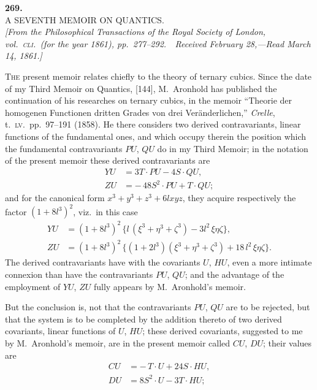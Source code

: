 \documentclass[11pt]{article}
\begin{document}
\newpage
\setcounter{page}{325}


\begin{center}
\textbf{269.}\\[1em]
{\Large A SEVENTH MEMOIR ON QUANTICS.}\\[1em]
\textit{[From the Philosophical Transactions of the Royal Society of London, vol.~\textsc{cli}.\ (for the year 1861), pp.~277--292.\ \ Received February 28,---Read March 14, 1861.]}
\end{center}

\medskip

\noindent\textsc{The} present memoir relates chiefly to the theory of ternary cubics. Since the date of my Third Memoir on Quantics, [144], M.~Aronhold has published the continuation of his researches on ternary cubics, in the memoir ``Theorie der homogenen Functionen dritten Grades von drei Ver\"anderlichen,'' \textit{Crelle}, t.~\textsc{lv}.\ pp.~97--191 (1858). He there considers two derived contravariants, linear functions of the fundamental ones, and which occupy therein the position which the fundamental contravariants $PU$, $QU$ do in my Third Memoir; in the notation of the present memoir these derived contravariants are
\[
\begin{aligned}
   Y U &= 3 T\cdot P U - 4 S\cdot Q U,\\
   Z U &= -\,48 S^2\cdot P U + T\cdot Q U;
\end{aligned}
\]
and for the canonical form $x^3 + y^3 + z^3 + 6 l x y z$, they acquire respectively the factor $(1 + 8 l^3)^2$, viz.\ in this case
\[
\begin{aligned}
   Y U &= (1 + 8 l^3)^2\,\{l\,(\xi^3 + \eta^3 + \zeta^3) - 3 l^2\,\xi\eta\zeta\},\\
   Z U &= (1 + 8 l^3)^2\,\{(1 + 2 l^3)(\xi^3 + \eta^3 + \zeta^3) + 18\,l^2\,\xi\eta\zeta\}.
\end{aligned}
\]
The derived contravariants have with the covariants $U$, $H U$, even a more intimate connexion than have the contravariants $P U$, $Q U$; and the advantage of the employment of $Y U$, $Z U$ fully appears by M.~Aronhold's memoir.

\medskip

\noindent But the conclusion is, not that the contravariants $P U$, $Q U$ are to be rejected, but that the system is to be completed by the addition thereto of two derived covariants, linear functions of $U$, $H U$; these derived covariants, suggested to me by M.~Aronhold's memoir, are in the present memoir called $C U$, $D U$; their values are
\[
\begin{aligned}
   C U &= -\,T\cdot U + 24 S\cdot H U,\\
   D U &= 8 S^2\cdot U - 3 T\cdot H U;
\end{aligned}
\]
\end{document}
